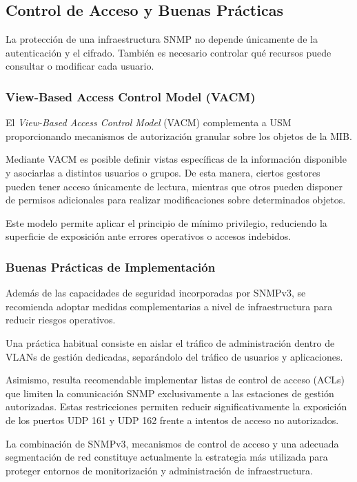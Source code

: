 \subsection{Control de Acceso y Buenas Prácticas}

La protección de una infraestructura SNMP no depende únicamente de la autenticación y el cifrado. También es necesario controlar qué recursos puede consultar o modificar cada usuario.

\subsubsection{View-Based Access Control Model (VACM)}

El \textit{View-Based Access Control Model} (VACM) complementa a USM proporcionando mecanismos de autorización granular sobre los objetos de la MIB.

Mediante VACM es posible definir vistas específicas de la información disponible y asociarlas a distintos usuarios o grupos. De esta manera, ciertos gestores pueden tener acceso únicamente de lectura, mientras que otros pueden disponer de permisos adicionales para realizar modificaciones sobre determinados objetos.

Este modelo permite aplicar el principio de mínimo privilegio, reduciendo la superficie de exposición ante errores operativos o accesos indebidos.

\subsubsection{Buenas Prácticas de Implementación}

Además de las capacidades de seguridad incorporadas por SNMPv3, se recomienda adoptar medidas complementarias a nivel de infraestructura para reducir riesgos operativos.

Una práctica habitual consiste en aislar el tráfico de administración dentro de VLANs de gestión dedicadas, separándolo del tráfico de usuarios y aplicaciones.

Asimismo, resulta recomendable implementar listas de control de acceso (ACLs) que limiten la comunicación SNMP exclusivamente a las estaciones de gestión autorizadas. Estas restricciones permiten reducir significativamente la exposición de los puertos UDP 161 y UDP 162 frente a intentos de acceso no autorizados.

La combinación de SNMPv3, mecanismos de control de acceso y una adecuada segmentación de red constituye actualmente la estrategia más utilizada para proteger entornos de monitorización y administración de infraestructura.
